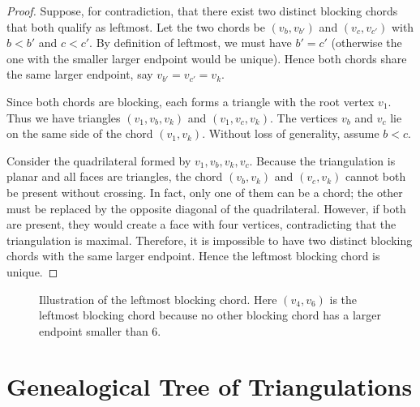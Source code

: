 \begin{proof}
    Suppose, for contradiction, that there exist two distinct blocking chords that both qualify as leftmost. 
    Let the two chords be \((v_b, v_{b'})\) and \((v_c, v_{c'})\) with \(b < b'\) and \(c < c'\). 
    By definition of leftmost, we must have \(b' = c'\) (otherwise the one with the smaller larger endpoint would be unique). 
    Hence both chords share the same larger endpoint, say \(v_{b'} = v_{c'} = v_k\).

    Since both chords are blocking, each forms a triangle with the root vertex \(v_1\). 
    Thus we have triangles \((v_1, v_b, v_k)\) and \((v_1, v_c, v_k)\). 
    The vertices \(v_b\) and \(v_c\) lie on the same side of the chord \((v_1, v_k)\). 
    Without loss of generality, assume \(b < c\).

    Consider the quadrilateral formed by \(v_1, v_b, v_k, v_c\). 
    Because the triangulation is planar and all faces are triangles, the chord \((v_b, v_k)\) and \((v_c, v_k)\) cannot both be present without crossing. 
    In fact, only one of them can be a chord; the other must be replaced by the opposite diagonal of the quadrilateral. 
    However, if both are present, they would create a face with four vertices, contradicting that the triangulation is maximal. 
    Therefore, it is impossible to have two distinct blocking chords with the same larger endpoint. 
    Hence the leftmost blocking chord is unique.
\end{proof}

\begin{figure}[htbp]
    \centering
    \caption{Illustration of the leftmost blocking chord. Here \((v_4, v_6)\) is the leftmost blocking chord because no other blocking chord has a larger endpoint smaller than 6.}
    \label{fig:leftmost_blocking}
\end{figure}

\section{Genealogical Tree of Triangulations}
\label{sec:genealogical_tree}

